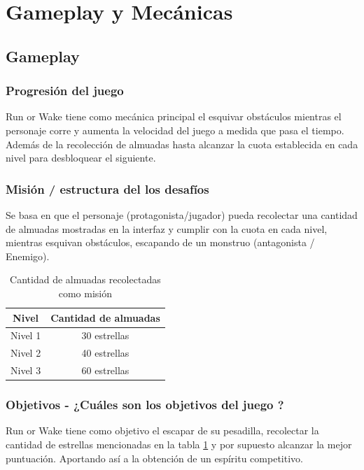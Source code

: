 \section{Gameplay y Mecánicas}
\subsection{Gameplay}
\subsubsection{Progresión del juego}
Run or Wake tiene como mecánica principal el esquivar obstáculos
mientras el personaje corre y aumenta la velocidad del juego a medida
que pasa el tiempo. Además de la recolección de almuadas hasta alcanzar
la cuota establecida en cada nivel para desbloquear el siguiente.
\subsubsection{Misión / estructura del los desafíos}
Se basa en que el personaje (protagonista/jugador) pueda recolectar una 
cantidad de almuadas mostradas en la interfaz y cumplir con la cuota en cada nivel, mientras
esquivan obstáculos, escapando de un monstruo (antagonista / Enemigo).

\begin{table}[!ht]
  \begin{center}
    \begin{tabular}{| c | c |}
      \hline
      Nivel & Cantidad de almuadas \\ \hline
      Nivel 1 & 30 estrellas \\ \hline
      Nivel 2 & 40 estrellas \\ \hline
      Nivel 3 & 60 estrellas \\ \hline
    \end{tabular}
    \caption{Cantidad de almuadas recolectadas como misión}
    \label{tab:estrellas}
  \end{center}
\end{table}

\subsubsection{ Objetivos - ¿Cuáles son los objetivos del juego ?}
Run or Wake tiene como objetivo el escapar de su pesadilla, recolectar
la cantidad de estrellas mencionadas en la tabla \ref{tab:estrellas}
y por supuesto alcanzar la mejor puntuación. Aportando así a la obtención
de un espíritu competitivo.

